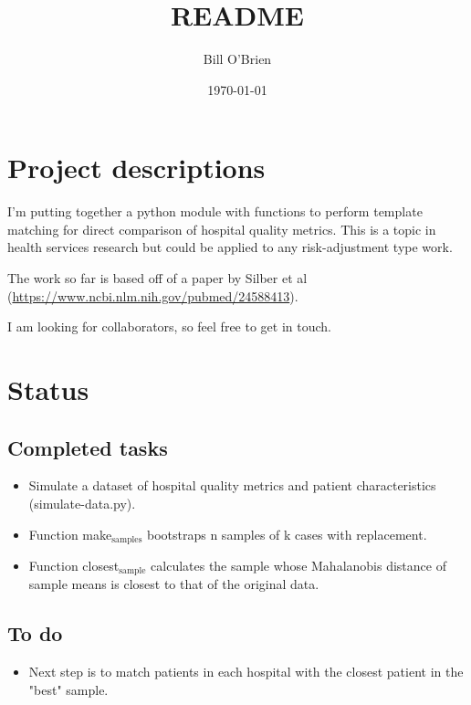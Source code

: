 \documentclass[11pt]{article}
\author{Bill O'Brien}
\date{\today}
\title{README}
\begin{document}
\maketitle
\tableofcontents


\section{Project descriptions}
\label{sec-1}
I'm putting together a python module with functions to perform template matching for direct comparison of hospital quality metrics. This is a topic in health services research but could be applied to any risk-adjustment type work. 

The work so far is based off of a paper by Silber et al (\url{https://www.ncbi.nlm.nih.gov/pubmed/24588413}). 

I am looking for collaborators, so feel free to get in touch. 

\section{Status}
\label{sec-2}
\subsection{Completed tasks}
\label{sec-2-1}
\begin{itemize}
\item Simulate a dataset of hospital quality metrics and patient characteristics (simulate-data.py).
\item Function make$_{\text{samples}}$ bootstraps n samples of k cases with replacement.
\item Function closest$_{\text{sample}}$ calculates the sample whose Mahalanobis distance of sample means is closest to that of the original data.
\end{itemize}

\subsection{To do}
\label{sec-2-2}
\begin{itemize}
\item Next step is to match patients in each hospital with the closest patient in the "best" sample.
\end{itemize}
\end{document}
